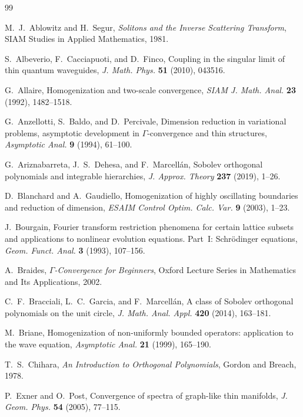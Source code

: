 \documentclass[11pt]{amsart}
\theoremstyle{plain}
\theoremstyle{definition}
\theoremstyle{remark}
\theoremstyle{remark}
\begin{document}
\begin{thebibliography}{99}

M.~J.~Ablowitz and H.~Segur,
\emph{Solitons and the Inverse Scattering Transform},
SIAM Studies in Applied Mathematics, 1981.

S.~Albeverio, F.~Cacciapuoti, and D.~Finco,
Coupling in the singular limit of thin quantum waveguides,
\emph{J. Math. Phys.} \textbf{51} (2010), 043516.

G.~Allaire,
Homogenization and two-scale convergence,
\emph{SIAM J. Math. Anal.} \textbf{23} (1992), 1482--1518.

G.~Anzellotti, S.~Baldo, and D.~Percivale,
Dimension reduction in variational problems, asymptotic development in $\Gamma$-convergence and thin structures,
\emph{Asymptotic Anal.} \textbf{9} (1994), 61--100.

G.~Ariznabarreta, J.~S.~Dehesa, and F.~Marcellán,
Sobolev orthogonal polynomials and integrable hierarchies,
\emph{J. Approx. Theory} \textbf{237} (2019), 1--26.

D.~Blanchard and A.~Gaudiello,
Homogenization of highly oscillating boundaries and reduction of dimension,
\emph{ESAIM Control Optim. Calc. Var.} \textbf{9} (2003), 1--23.

J.~Bourgain,
Fourier transform restriction phenomena for certain lattice subsets and applications to nonlinear evolution equations. Part~I: Schrödinger equations,
\emph{Geom. Funct. Anal.} \textbf{3} (1993), 107--156.

A.~Braides,
\emph{$\Gamma$-Convergence for Beginners},
Oxford Lecture Series in Mathematics and Its Applications, 2002.

C.~F.~Bracciali, L.~C.~Garcia, and F.~Marcellán,
A class of Sobolev orthogonal polynomials on the unit circle,
\emph{J. Math. Anal. Appl.} \textbf{420} (2014), 163--181.

M.~Briane,
Homogenization of non-uniformly bounded operators: application to the wave equation,
\emph{Asymptotic Anal.} \textbf{21} (1999), 165--190.

T.~S.~Chihara,
\emph{An Introduction to Orthogonal Polynomials},
Gordon and Breach, 1978.

P.~Exner and O.~Post,
Convergence of spectra of graph-like thin manifolds,
\emph{J. Geom. Phys.} \textbf{54} (2005), 77--115.


\end{thebibliography}
\end{document}
